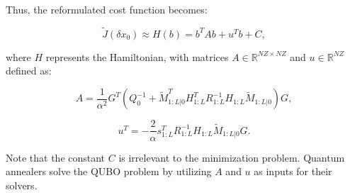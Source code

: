 \documentclass{article}
\begin{document}
Thus, the reformulated cost function becomes:

\[
\tilde{J}(\delta x_0) \approx H(b) = b^T A b + u^T b + C,
\]

where \( H \) represents the Hamiltonian, with matrices \( A \in \mathbb{R}^{NZ \times NZ} \) and \( u \in \mathbb{R}^{NZ} \) defined as:

\[
A = \frac{1}{\alpha^2} G^T \left( Q_0^{-1} + \tilde{M}^T_{1:L|0} H^T_{1:L} R_{1:L}^{-1} H_{1:L} \tilde{M}_{1:L|0} \right) G,
\]

\[
u^T = -\frac{2}{\alpha} s^T_{1:L} R_{1:L}^{-1} H_{1:L} \tilde{M}_{1:L|0} G.
\]

Note that the constant \( C \) is irrelevant to the minimization problem. Quantum annealers solve the QUBO problem by utilizing \( A \) and \( u \) as inputs for their solvers.
\end{document}
